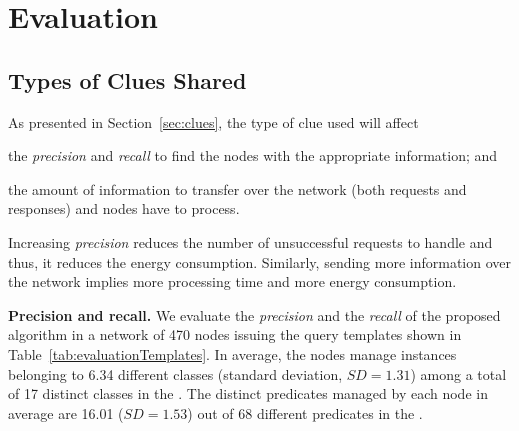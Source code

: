 \section{Evaluation}
\label{sec:search_evaluation}

\subsection{Types of Clues Shared}
\label{sec:clues_eval}
As presented in Section~\ref{sec:clues}, the type of clue used will affect
\begin{enumerate*}[label=\itshape(\arabic*\upshape)]
  \item the \emph{precision} and \emph{recall} to find the nodes with the appropriate information; and %
  \item the amount of information to transfer over the network (both requests and responses) and nodes have to process.
\end{enumerate*}
Increasing \emph{precision} reduces the number of unsuccessful requests to handle and thus, it reduces the energy consumption. 
Similarly, sending more information over the network implies more processing time and more energy consumption.

\medskip

\noindent\textbf{Precision and recall.}
We evaluate the \emph{precision} and the \emph{recall} of the proposed algorithm in a network of 470 nodes issuing the query templates shown in Table~\ref{tab:evaluationTemplates}.
In average, the nodes manage instances belonging to 6.34 different classes (standard deviation, $SD=1.31$) among a total of 17 distinct classes in the \Space{}.
The distinct predicates managed by each node in average are 16.01 ($SD=1.53$) out of 68 different predicates in the \Space{}.


\newcommand{\tplone}{\emph{T1}}
\newcommand{\tpltwo}{\emph{T2}}
\newcommand{\tplthree}{\emph{T3}}
\newcommand{\tplfour}{\emph{T4}}
\newcommand{\tplfive}{\emph{T5}}


